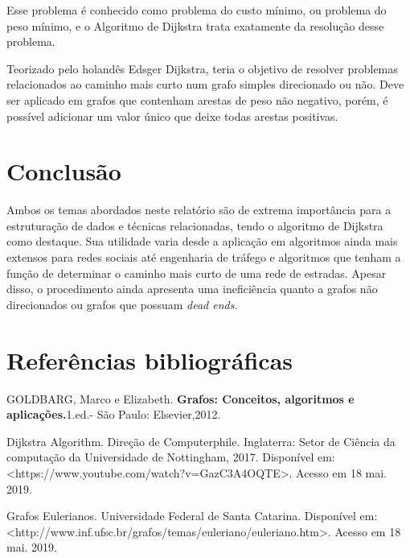 \documentclass[a4paper, 12pt]{article}
\begin{document}
Esse problema é conhecido como problema do custo mínimo, ou problema do peso mínimo, e o Algoritmo de Dijkstra trata exatamente da resolução desse problema.

Teorizado pelo holandês Edsger Dijkstra, teria o objetivo de resolver problemas relacionados ao caminho mais curto num grafo simples direcionado ou não. Deve ser aplicado em grafos que contenham arestas de peso não negativo, porém, é possível adicionar um valor único que deixe todas arestas positivas.

\newpage
\section{Conclusão}

Ambos os temas abordados neste relatório são de extrema importância para a estruturação de dados e técnicas relacionadas, tendo o algoritmo de Dijkstra como destaque. Sua utilidade varia desde a aplicação em algoritmos ainda mais extensos para redes sociais até engenharia de tráfego e algoritmos que tenham a função de determinar o caminho mais curto de uma rede de estradas. Apesar disso, o procedimento ainda apresenta uma ineficiência quanto a grafos não direcionados ou grafos que possuam \textit{dead ends}.

\section{Referências bibliográficas}

\medskip GOLDBARG, Marco e Elizabeth. \textbf{Grafos: Conceitos, algoritmos e aplicações.}1.ed.- São Paulo: Elsevier,2012.

\medskip Dijkstra Algorithm. Direção de Computerphile. Inglaterra: Setor de Ciência da computação da Universidade de Nottingham, 2017. Disponível em: \\<https://www.youtube.com/watch?v=GazC3A4OQTE>. Acesso em 18 mai. 2019.


\medskip Grafos Eulerianos. Universidade Federal de Santa Catarina. Disponível em:\\ <http://www.inf.ufsc.br/grafos/temas/euleriano/euleriano.htm>. Acesso em 18 mai. 2019. 
\end{document}
